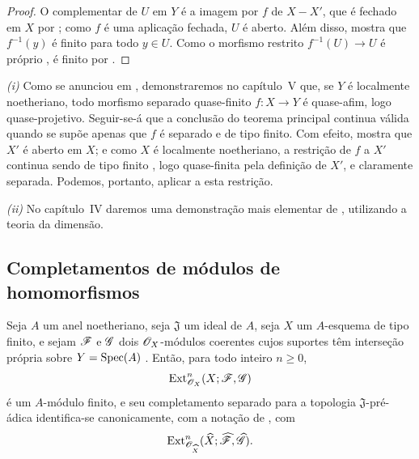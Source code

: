 \begin{proof}
O complementar de $U$ em $Y$ é a imagem por $f$ de $X-X'$, que
é fechado em $X$ por ; como $f$ é uma aplicação
fechada, $U$ é aberto. Além disso,  mostra que
$f^{-1}(y)$ é finito para todo $y\in U$. Como o morfismo restrito
$f^{-1}(U)\to U$ é próprio , é finito por
.
\end{proof}

\begin{remark}[4.4.12]
\label{III.4.4.12}
\emph{(i)}
Como se anunciou em , demonstraremos no capítulo~V
que, se $Y$ é localmente noetheriano, todo morfismo separado
quase-finito $f:X\to Y$ é quase-afim, logo quase-projetivo. Seguir-se-á
que a conclusão do teorema principal  continua
válida quando se supõe apenas que $f$ é separado e de tipo finito.
Com efeito,  mostra que $X'$ é aberto em $X$; e
como $X$ é localmente noetheriano, a restrição de $f$ a $X'$ continua
sendo de tipo finito , logo quase-finita pela
definição de $X'$, e claramente separada. Podemos, portanto, aplicar
 a esta restrição.

\emph{(ii)}
No capítulo~IV daremos uma demonstração mais elementar de
, utilizando a teoria da dimensão.
\end{remark}


\subsection{Completamentos de módulos de homomorfismos}
\label{subsection:III.4.5}

\begin{proposition}[4.5.1]
\label{III.4.5.1}
Seja $A$ um anel noetheriano, seja $\mathfrak J$ um ideal de $A$, seja
$X$ um $A$-esquema de tipo finito, e sejam $\mathscr{F}$ e $\mathscr{G}$ dois
$\mathscr{O}_X$-módulos coerentes cujos suportes têm interseção
própria sobre $Y=\operatorname{Spec}(A)$ . Então, para todo
inteiro $n\geq0$,
\[
  \operatorname{Ext}^n_{\mathscr{O}_X}(X;\mathscr{F},\mathscr{G})
\]
é um $A$-módulo finito, e seu completamento separado para a topologia
$\mathfrak J$-pré-ádica identifica-se canonicamente, com a notação de
, com
\[
  \operatorname{Ext}^n_{\mathscr{O}_{\widehat{X}}}
    (\widehat{X};\widehat{\mathscr{F}},\widehat{\mathscr{G}}).
\]
\end{proposition}

